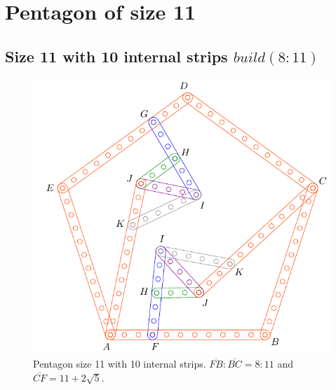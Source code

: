 \documentclass[11pt]{article}
\begin{document}
\section{Pentagon of size 11}

\subsection{Size 11 with 10 internal strips $build(8:11)$}

\begin{figure}[h]
 \centering
 \includegraphics[scale=0.85]{11/penta11a}
 \caption{Pentagon size 11 with 10 internal strips. $\overline{FB}:\overline{BC} = 8:11$ and $\overline{CF} = 11 + 2\sqrt5$.}
 \label{fig:penta11a}
\end{figure}
\end{document}
